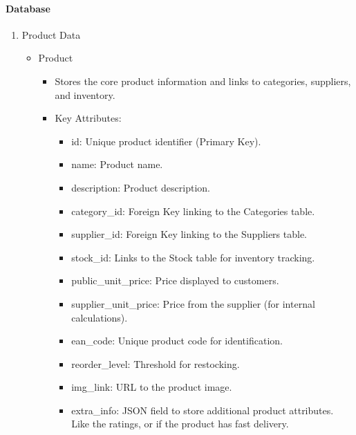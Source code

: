 \documentclass{llncs}
\begin{document}
\paragraph{Database}
\begin{enumerate}
    \item Product Data
          \begin{itemize}
              \item Product
                    \begin{itemize}
                        \item Stores the core product information and links to categories, suppliers, and inventory.
                        \item Key Attributes:
                              \begin{itemize}
                                  \item id: Unique product identifier (Primary Key).
                                  \item name: Product name.
                                  \item description: Product description.
                                  \item category\_id: Foreign Key linking to the Categories table.
                                  \item supplier\_id: Foreign Key linking to the Suppliers table.
                                  \item stock\_id: Links to the Stock table for inventory tracking.
                                  \item public\_unit\_price: Price displayed to customers.
                                  \item supplier\_unit\_price: Price from the supplier (for internal calculations).
                                  \item ean\_code: Unique product code for identification.
                                  \item reorder\_level: Threshold for restocking.
                                  \item img\_link: URL to the product image.
                                  \item extra\_info: JSON field to store additional product attributes. Like the ratings, or if the product has fast delivery.
                              \end{itemize}
                    \end{itemize}

\end{itemize}
\end{enumerate}
\end{document}
